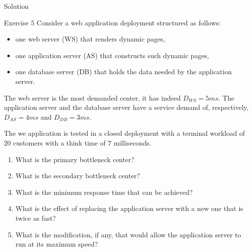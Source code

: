 \documentclass[handout]{beamer}
\begin{document}
\begin{frame}[allowframebreaks]{Solution}
\end{frame}


\begin{frame}[allowframebreaks]{Exercise 5}
Consider a web application deployment structured as follows:
\begin{itemize}
\item one web server (WS) that renders dynamic pages,
\item one application server (AS) that constructs such dynamic pages,
\item  one database server (DB) that holds the data needed by the application server.
\end{itemize}
The web server is the most demanded center, it has indeed $D_{WS} = 5ms$.
The application server and the database server have a service demand of, respectively,
$D_{AS} = 4ms$ and $D_{DB} = 3ms$.

The we application is tested in a closed deployment with a terminal workload of 20 customers
with a think time of 7 milliseconds.

\begin{enumerate}
\item  What is the primary bottleneck center?
\item  What is the secondary bottleneck center?
\item  What is the minimum response time that can be achieved?
\item  What is the effect of replacing the application server with a new one that is twice as fast?
\item What is the modification, if any, that would allow the application server to run at its maximum speed?
\end{enumerate}
\end{frame}
\end{document}

